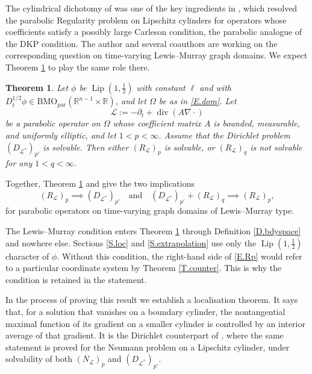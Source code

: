 \documentclass[12pt,leqno]{amsart}
\numberwithin{equation}{section}
\DeclareMathOperator{\Lip}{Lip}
\DeclareMathOperator{\divg}{div}
\newcommand{\R}{\mathbb R}
\newcommand{\br}[1]{\left(#1\right)}
\newcommand{\om}{\Omega}
\newcommand{\pd}{\partial}
\newcommand{\dhalf}{D_t^{1/2}}
\newcommand{\BMOpar}{\mathrm{BMO}_{\mathrm{par}}}
\newcommand{\LL}{\mathcal L}
\theoremstyle{plain}
\newtheorem{theorem}[equation]{Theorem}
\theoremstyle{remark}
\begin{document}
The cylindrical dichotomy of \cite{DN} was one of the key ingredients in
\cite{DLP}, which resolved the parabolic Regularity problem on Lipschitz
cylinders for operators whose coefficients satisfy a possibly large Carleson
condition, the parabolic analogue of the DKP condition. The author and several
coauthors are working on the corresponding question on time-varying
Lewis--Murray graph domains. We expect Theorem \ref{T.dual} to play the same
role there.\medskip

\begin{theorem}\label{T.dual}
Let $\phi$ be $\Lip(1,\tfrac12)$ with constant $\ell$ and with
$\dhalf\phi\in\BMOpar(\R^{n-1}\times\R)$, and let $\om$ be as in
\eqref{E.dom}. Let
$$\LL:=-\pd_t+\divg\br{A\nabla\cdot}$$
be a parabolic operator on $\om$ whose coefficient matrix $A$ is bounded,
measurable, and uniformly elliptic, and let $1<p<\infty$. Assume that the
Dirichlet problem $(D_{\LL^*})_{p'}$ is solvable. Then either $(R_{\LL})_p$ is
solvable, or $(R_{\LL})_q$ is not solvable for any $1<q<\infty$.
\end{theorem}

Together, Theorem \ref{T.dual} and \cite{DD} give the two implications
\[ (R_{\LL})_p \implies (D_{\LL^*})_{p'} \quad\mbox{and}\quad
   (D_{\LL^*})_{p'} + (R_{\LL})_q \implies (R_{\LL})_p, \]
for parabolic operators on time-varying graph domains of Lewis--Murray type.\medskip

\noindent The Lewis--Murray condition enters Theorem \ref{T.dual} through
Definition \ref{D.bdyspace} and nowhere else. Sections \ref{S.loc} and
\ref{S.extrapolation} use only the $\Lip(1,\tfrac12)$ character of $\phi$.
Without this condition, the right-hand side of \eqref{E.Rp} would refer to a
particular coordinate system by Theorem \ref{T.counter}. This is why the
condition is retained in the statement.\medskip

In the process of proving this result we establish a localisation theorem. It
says that, for a solution that vanishes on a boundary cylinder, the
nontangential maximal function of its gradient on a smaller cylinder is
controlled by an interior average of that gradient. It is the Dirichlet
counterpart of
\cite[Theorem 1.2]{DLP2}, where the same statement is proved for the Neumann
problem on a Lipschitz cylinder, under solvability of both $(N_\LL)_p$ and
$(D_{\LL^*})_{p'}$.
\end{document}
